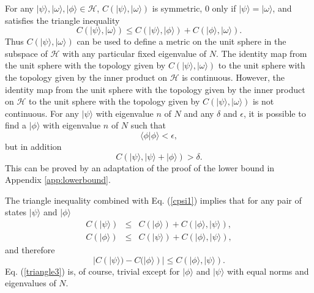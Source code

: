 \documentclass[12pt,amsmath,amssymb,onecolumn]{revtex4-2}
\begin{document}
For any $|\psi \rangle , |\omega \rangle , |\phi \rangle  \in \mathcal{H}$,
$C( |\psi \rangle , |\omega \rangle )$ is symmetric,
0 only if $|\psi \rangle  =|\omega \rangle $, and satisfies the triangle inequality
\begin{equation}
  \label{triangle}
  C( |\psi \rangle , |\omega \rangle ) \le C( |\psi \rangle , |\phi \rangle ) + C( |\phi \rangle , |\omega \rangle ).
\end{equation}
Thus $C( |\psi \rangle , |\omega \rangle )$ can be used to define a metric on the unit
sphere in the subspace of $\mathcal{H}$ with any particular fixed
eigenvalue of $N$. The identity map from the unit sphere with
the topology given by $C( |\psi \rangle , |\omega \rangle )$ to the unit sphere with
the topology given by the inner product on $\mathcal{H}$ is continuous.
However, the identity map from the unit sphere with
the topology given by the inner product on $\mathcal{H}$ to the unit sphere with
the topology given by $C( |\psi \rangle , |\omega \rangle )$ is not continuous.
For any $|\psi \rangle $ with eigenvalue $n$ of $N$ and any $\delta$ and $\epsilon$, it is possible to
find a $|\phi \rangle $ with eigenvalue $n$ of $N$
such that
\begin{equation}
  \label{epsilonupper}
   \langle  \phi | \phi \rangle  < \epsilon,
\end{equation}
but in addition
\begin{equation}
  \label{deltalower}
  C( |\psi \rangle , |\psi \rangle  + |\phi \rangle ) > \delta.
\end{equation}
This can be proved by an adaptation of the proof of the lower bound
in Appendix \ref{app:lowerbound}.

The triangle inequality combined with Eq. (\ref{cpsi1}) implies that
for any pair of states $|\psi \rangle $ and $|\phi \rangle $ 
\begin{subequations}
  \begin{eqnarray}
    \label{triangle1}
    C( |\psi \rangle ) &\le& C(|\phi \rangle ) + C(|\phi \rangle ,|\psi \rangle ), \\
    \label{triangle2}
    C( |\phi \rangle ) &\le& C(|\psi \rangle ) + C(|\phi \rangle ,|\psi \rangle ),
  \end{eqnarray}
\end{subequations}
and therefore 
\begin{equation}
    \label{triangle3}
    |C( |\psi \rangle ) - C(|\phi \rangle )| \le C(|\phi \rangle ,|\psi \rangle ).
\end{equation}
Eq. (\ref{triangle3}) is, of course, trivial except for
$|\phi \rangle $ and $|\psi \rangle $ with equal norms and eigenvalues of $N$.
\end{document}
